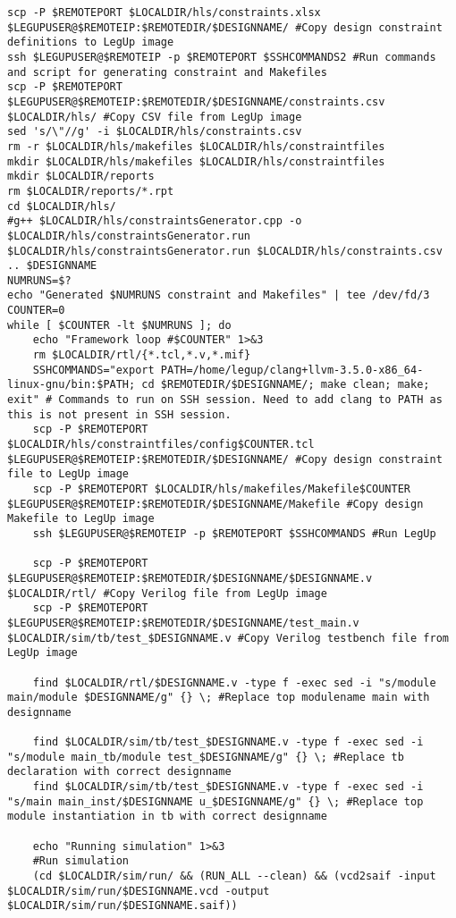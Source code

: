 \begin{lstlisting}[caption={HLS Script source code},label=lst:hlsscriptsourcecode]
scp -P $REMOTEPORT $LOCALDIR/hls/constraints.xlsx $LEGUPUSER@$REMOTEIP:$REMOTEDIR/$DESIGNNAME/ #Copy design constraint definitions to LegUp image
ssh $LEGUPUSER@$REMOTEIP -p $REMOTEPORT $SSHCOMMANDS2 #Run commands and script for generating constraint and Makefiles
scp -P $REMOTEPORT $LEGUPUSER@$REMOTEIP:$REMOTEDIR/$DESIGNNAME/constraints.csv $LOCALDIR/hls/ #Copy CSV file from LegUp image
sed 's/\"//g' -i $LOCALDIR/hls/constraints.csv
rm -r $LOCALDIR/hls/makefiles $LOCALDIR/hls/constraintfiles
mkdir $LOCALDIR/hls/makefiles $LOCALDIR/hls/constraintfiles
mkdir $LOCALDIR/reports
rm $LOCALDIR/reports/*.rpt
cd $LOCALDIR/hls/
#g++ $LOCALDIR/hls/constraintsGenerator.cpp -o $LOCALDIR/hls/constraintsGenerator.run
$LOCALDIR/hls/constraintsGenerator.run $LOCALDIR/hls/constraints.csv .. $DESIGNNAME
NUMRUNS=$?
echo "Generated $NUMRUNS constraint and Makefiles" | tee /dev/fd/3
COUNTER=0
while [ $COUNTER -lt $NUMRUNS ]; do
	echo "Framework loop #$COUNTER" 1>&3
	rm $LOCALDIR/rtl/{*.tcl,*.v,*.mif}
	SSHCOMMANDS="export PATH=/home/legup/clang+llvm-3.5.0-x86_64-linux-gnu/bin:$PATH; cd $REMOTEDIR/$DESIGNNAME/; make clean; make; exit" # Commands to run on SSH session. Need to add clang to PATH as this is not present in SSH session.
	scp -P $REMOTEPORT $LOCALDIR/hls/constraintfiles/config$COUNTER.tcl $LEGUPUSER@$REMOTEIP:$REMOTEDIR/$DESIGNNAME/ #Copy design constraint file to LegUp image
	scp -P $REMOTEPORT $LOCALDIR/hls/makefiles/Makefile$COUNTER $LEGUPUSER@$REMOTEIP:$REMOTEDIR/$DESIGNNAME/Makefile #Copy design Makefile to LegUp image
	ssh $LEGUPUSER@$REMOTEIP -p $REMOTEPORT $SSHCOMMANDS #Run LegUp
	
	scp -P $REMOTEPORT $LEGUPUSER@$REMOTEIP:$REMOTEDIR/$DESIGNNAME/$DESIGNNAME.v $LOCALDIR/rtl/ #Copy Verilog file from LegUp image
	scp -P $REMOTEPORT $LEGUPUSER@$REMOTEIP:$REMOTEDIR/$DESIGNNAME/test_main.v $LOCALDIR/sim/tb/test_$DESIGNNAME.v #Copy Verilog testbench file from LegUp image
	
	find $LOCALDIR/rtl/$DESIGNNAME.v -type f -exec sed -i "s/module main/module $DESIGNNAME/g" {} \; #Replace top modulename main with designname
	
	find $LOCALDIR/sim/tb/test_$DESIGNNAME.v -type f -exec sed -i "s/module main_tb/module test_$DESIGNNAME/g" {} \; #Replace tb declaration with correct designname
	find $LOCALDIR/sim/tb/test_$DESIGNNAME.v -type f -exec sed -i "s/main main_inst/$DESIGNNAME u_$DESIGNNAME/g" {} \; #Replace top module instantiation in tb with correct designname
	
	echo "Running simulation" 1>&3
	#Run simulation
	(cd $LOCALDIR/sim/run/ && (RUN_ALL --clean) && (vcd2saif -input $LOCALDIR/sim/run/$DESIGNNAME.vcd -output $LOCALDIR/sim/run/$DESIGNNAME.saif)) 
	

\end{lstlisting}
